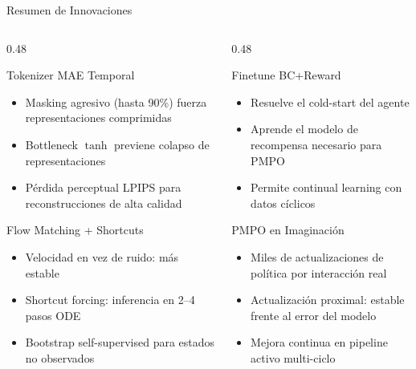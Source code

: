 \documentclass[aspectratio=169, 12pt]{beamer}
\begin{document}
\begin{frame}{Resumen de Innovaciones}
\begin{columns}[T]
  \begin{column}{0.48\textwidth}
    \begin{block}{\faEye\; Tokenizer MAE Temporal}
      \begin{itemize}\small
        \item Masking agresivo (hasta 90\%) fuerza representaciones comprimidas
        \item Bottleneck $\tanh$ previene colapso de representaciones
        \item Pérdida perceptual LPIPS para reconstrucciones de alta calidad
      \end{itemize}
    \end{block}
    \vspace{6pt}
    \begin{block}{\faBrain\; Flow Matching + Shortcuts}
      \begin{itemize}\small
        \item Velocidad en vez de ruido: más estable
        \item Shortcut forcing: inferencia en 2--4 pasos ODE
        \item Bootstrap self-supervised para estados no observados
      \end{itemize}
    \end{block}
  \end{column}
  \begin{column}{0.48\textwidth}
    \begin{block}{\faGraduationCap\; Finetune BC+Reward}
      \begin{itemize}\small
        \item Resuelve el cold-start del agente
        \item Aprende el modelo de recompensa necesario para PMPO
        \item Permite continual learning con datos cíclicos
      \end{itemize}
    \end{block}
    \vspace{6pt}
    \begin{block}{\faRobot\; PMPO en Imaginación}
      \begin{itemize}\small
        \item Miles de actualizaciones de política por interacción real
        \item Actualización proximal: estable frente al error del modelo
        \item Mejora continua en pipeline activo multi-ciclo
      \end{itemize}
    \end{block}
  \end{column}
\end{columns}
\end{frame}
\end{document}
